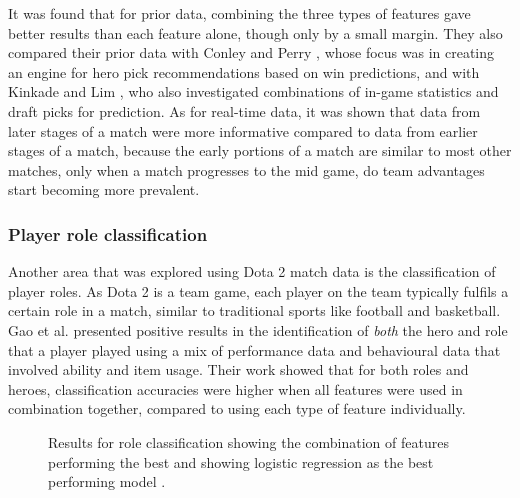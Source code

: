 \documentclass[Report.tex]{subfiles}
\begin{document}
It was found that for prior data, combining the three types of features gave better results than each feature alone, though only by a small margin. They also compared their prior data with Conley and Perry \cite{dota-conley}, whose focus was in creating an engine for hero pick recommendations based on win predictions, and with Kinkade and Lim \cite{dota-kinkade}, who also investigated combinations of in-game statistics and draft picks for prediction. As for real-time data, it was shown that data from later stages of a match were more informative compared to data from earlier stages of a match, because the early portions of a match are similar to most other matches, only when a match progresses to the mid game, do team advantages start becoming more prevalent.

\subsubsection{Player role classification}
Another area that was explored using Dota 2 match data is the classification of player roles. As Dota 2 is a team game, each player on the team typically fulfils a certain role in a match, similar to traditional sports like football and basketball. Gao et al. \cite{dota-gao} presented positive results in the identification of \textit{both} the hero and role that a player played using a mix of performance data and behavioural data that involved ability and item usage. Their work showed that for both roles and heroes, classification accuracies were higher when all features were used in combination together, compared to using each type of feature individually.

\begin{figure}[H]
\begin{subfigure}{0.45\textwidth}
\end{subfigure}
\hspace{\fill}
\begin{subfigure}{0.45\textwidth}
\end{subfigure}
\caption{Results for role classification showing the combination of features performing the best \cite{dota-gao} and showing logistic regression as the best performing model \cite{dota-eggert}.}
\label{fig:dota-role-results}
\end{figure}
\end{document}
